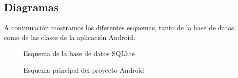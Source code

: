 \pagebreak

\subsection{Diagramas}
A continuación mostramos los diferentes esquemas, tanto de la base de datos como de las clases de la aplicación Android.

\begin{figure}[H]
	\centering
	\caption{Esquema de la base de datos SQLlite}
	\label{fig:eSQLlite}
\end{figure}

\begin{figure}[H]
	\centering
	\caption{Esquema principal del proyecto Android} 
	\label{fig:and-general}
\end{figure}

